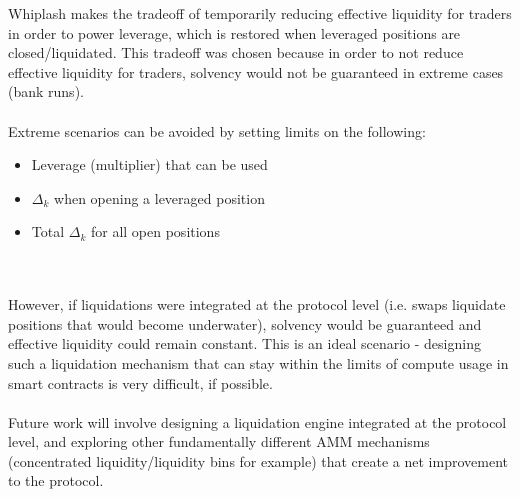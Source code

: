 \documentclass[11pt]{article}
\begin{document}
Whiplash makes the tradeoff of temporarily reducing effective liquidity for traders in order to power leverage, which is restored when leveraged positions are closed/liquidated. This tradeoff was chosen because in order to not reduce effective liquidity for traders, solvency would not be guaranteed in extreme cases (bank runs).
\\\\
Extreme scenarios can be avoided by setting limits on the following:
\begin{itemize}
    \item Leverage (multiplier) that can be used
    \item $\Delta_k$ when opening a leveraged position
    \item Total $\Delta_k$ for all open positions
\end{itemize}
\\\\
However, if liquidations were integrated at the protocol level (i.e. swaps liquidate positions that would become underwater), solvency would be guaranteed and effective liquidity could remain constant. This is an ideal scenario - designing such a liquidation mechanism that can stay within the limits of compute usage in smart contracts is very difficult, if possible.
\\\\
Future work will involve designing a liquidation engine integrated at the protocol level, and exploring other fundamentally different AMM mechanisms (concentrated liquidity/liquidity bins for example) that create a net improvement to the protocol.
\end{document}
